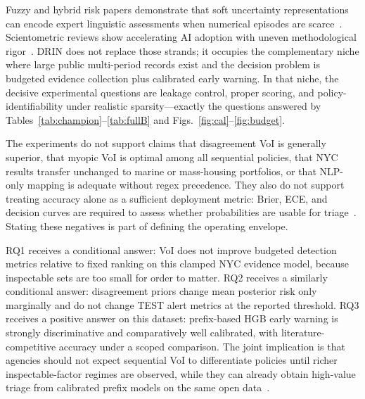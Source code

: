 Fuzzy and hybrid risk papers demonstrate that soft uncertainty representations can encode expert linguistic assessments when numerical episodes are scarce~\cite{Ebrat2014,Islam2017}. Scientometric reviews show accelerating AI adoption with uneven methodological rigor~\cite{Darko2020,PanYZhang2021,Abioye2021,Regona2024}. DRIN does not replace those strands; it occupies the complementary niche where large public multi-period records exist and the decision problem is budgeted evidence collection plus calibrated early warning. In that niche, the decisive experimental questions are leakage control, proper scoring, and policy-identifiability under realistic sparsity---exactly the questions answered by Tables~\ref{tab:champion}--\ref{tab:fullB} and Figs.~\ref{fig:cal}--\ref{fig:budget}.

The experiments do not support claims that disagreement VoI is generally superior, that myopic VoI is optimal among all sequential policies, that NYC results transfer unchanged to marine or mass-housing portfolios, or that NLP-only mapping is adequate without regex precedence. They also do not support treating accuracy alone as a sufficient deployment metric: Brier, ECE, and decision curves are required to assess whether probabilities are usable for triage~\cite{Gneiting2007,Vickers2006}. Stating these negatives is part of defining the operating envelope.

RQ1 receives a conditional answer: VoI does not improve budgeted detection metrics relative to fixed ranking on this clamped NYC evidence model, because inspectable sets are too small for order to matter. RQ2 receives a similarly conditional answer: disagreement priors change mean posterior risk only marginally and do not change TEST alert metrics at the reported threshold. RQ3 receives a positive answer on this dataset: prefix-based HGB early warning is strongly discriminative and comparatively well calibrated, with literature-competitive accuracy under a scoped comparison. The joint implication is that agencies should not expect sequential VoI to differentiate policies until richer inspectable-factor regimes are observed, while they can already obtain high-value triage from calibrated prefix models on the same open data~\cite{Luu2009,Memarzadeh2016,Egwim2021,Tagharobi2025}.
